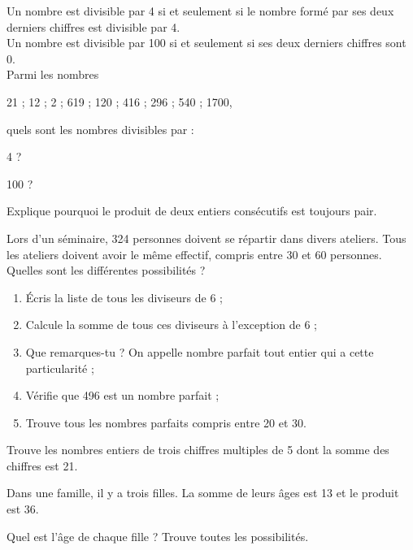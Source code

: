 \begin{exercice}
Un nombre est divisible par 4 si et seulement si le nombre formé par ses deux derniers chiffres est divisible par 4.\\[0.5em]
Un nombre est divisible par 100 si et seulement si ses deux derniers chiffres sont 0.\\[0.5em]
Parmi les nombres

21 ; 12 ; 2 ; 619 ; 120 ; 416 ; 296 ; 540 ; 1700,

quels sont les nombres divisibles par :
\begin{colenumerate}{2}
 \item 4 ?
 \item 100 ?
 \end{colenumerate}
\end{exercice}


\begin{exercice}[Pair]
Explique pourquoi le produit de deux entiers consécutifs est toujours pair.
\end{exercice}


\begin{exercice}[Séminaire]
Lors d'un séminaire, 324 personnes doivent se répartir dans divers ateliers. Tous les ateliers doivent avoir le même effectif, compris entre 30 et 60 personnes. Quelles sont les différentes possibilités ?
\end{exercice}


\begin{exercice}
\begin{enumerate}
 \item Écris la liste de tous les diviseurs de 6 ;
 \item Calcule la somme de tous ces diviseurs à l'exception de 6 ;
 \item Que remarques-tu ? On appelle nombre parfait tout entier qui a cette particularité ;
 \item Vérifie que 496 est un nombre parfait ;
 \item Trouve tous les nombres parfaits compris entre 20 et 30.
 \end{enumerate}
\end{exercice}


\begin{exercice}
Trouve les nombres entiers de trois chiffres multiples de 5 dont la somme des chiffres est 21.
\end{exercice}


\begin{exercice}
Dans une famille, il y a trois filles. La somme de leurs âges est 13 et le produit est 36.

Quel est l'âge de chaque fille ? Trouve toutes les possibilités.
\end{exercice}


